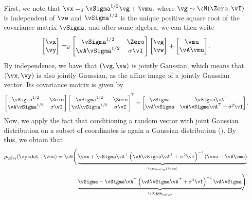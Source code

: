 \documentclass[../../book-main.tex]{subfiles}
\begin{document}
\begin{example}
  First, we note that $\vx =_{d} \vSigma^{1/2} \vg + \vmu$, where $\vg \sim
  \cN(\Zero, \vI)$ is independent of $\vw$ and $\vSigma^{1/2}$ is the unique
  positive square root of the covariance matrix $\vSigma$, and
  after some algebra, we can then write
  \begin{equation*}
    \begin{bmatrix}
      \vx \\
      \vy
    \end{bmatrix}
    =_{d}
    \begin{bmatrix}
      \vSigma^{1/2} & \Zero \\
      \vA \vSigma^{1/2} & \sigma \vI
    \end{bmatrix}
    \begin{bmatrix}
      \vg \\
      \vw
    \end{bmatrix}
    +
    \begin{bmatrix}
      \vmu \\
      \vA\vmu
    \end{bmatrix}.
  \end{equation*}
  By independence, we have that $(\vg, \vw)$ is jointly Gaussian, which means that
  $(\vx, \vy)$ is also jointly Gaussian, as the affine image of a jointly Gaussian
  vector.
  Its covariance matrix is given by
  \begin{equation*}
    \begin{bmatrix}
      \vSigma^{1/2} & \Zero \\
      \vA \vSigma^{1/2} & \sigma \vI
    \end{bmatrix}
    \begin{bmatrix}
      \vSigma^{1/2} & \Zero \\
      \vA \vSigma^{1/2} & \sigma \vI
    \end{bmatrix}^\top
    =
    \begin{bmatrix}
      \vSigma & \vSigma \vA^\top \\
      \vA \vSigma & \vA \vSigma \vA^\top + \sigma^2 \vI
    \end{bmatrix}.
  \end{equation*}
  Now, we apply the fact that conditioning a random vector with joint Gaussian
  distribution on a subset of coordinates is again a Gaussian distribution
  ().
  By this, we obtain that
  \begin{equation}
    \begin{split}
    p_{\x \mid \y}(\spcdot \mid \vnu) = \cN\Biggl(
    &\underbrace{%
      \vmu + \vSigma\vA^\top \left(\vA\vSigma\vA^\top + \sigma^2 \vI\right)^{-1} 
      (\vnu - \vA\vmu)}_{\vmu_{\vx \mid \vy}(\vnu)}, \\
      &\underbrace{%
      \vSigma - \vSigma \vA^\top \left(\vA\vSigma\vA^\top + \sigma^2
      \vI\right)^{-1} \vA \vSigma}_{\vSigma_{\vx\mid \vy}}
    \Biggr).
    \end{split}
  \end{equation}


\end{example}
\end{document}
